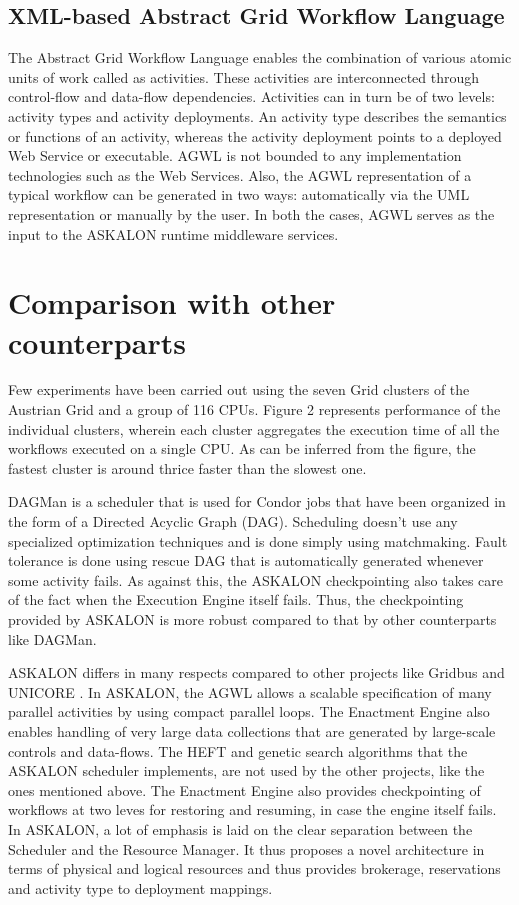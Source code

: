\documentclass[9pt,twocolumn,twoside]{../../styles/osajnl}
\begin{document}
\subsection{XML-based Abstract Grid Workflow Language}
The Abstract Grid Workflow Language enables the combination of various
atomic units of work called as activities.  These activities are
interconnected through control-flow and data-flow dependencies.
Activities can in turn be of two levels: activity types and activity
deployments.  An activity type describes the semantics or functions of
an activity, whereas the activity deployment points to a deployed Web
Service or executable.  AGWL is not bounded to any implementation
technologies such as the Web Services.  Also, the AGWL representation
of a typical workflow can be generated in two ways: automatically via
the UML representation or manually by the user.  In both the cases,
AGWL serves as the input to the ASKALON runtime middleware services.

\section{Comparison with other counterparts}
Few experiments have been carried out using the seven Grid clusters of
the Austrian Grid \cite{Austrian-grid} and a group of 116 CPUs.
Figure 2 represents performance of the individual clusters, wherein
each cluster aggregates the execution time of all the workflows
executed on a single CPU.  As can be inferred from the figure, the
fastest cluster is around thrice faster than the slowest one.

DAGMan \cite{DAGMan} is a scheduler that is used for Condor jobs that
have been organized in the form of a Directed Acyclic Graph (DAG).
Scheduling doesn't use any specialized optimization techniques and is
done simply using matchmaking.  Fault tolerance is done using rescue
DAG that is automatically generated whenever some activity fails.  As
against this, the ASKALON checkpointing also takes care of the fact
when the Execution Engine itself fails.  Thus, the checkpointing
provided by ASKALON is more robust compared to that by other
counterparts like DAGMan.

ASKALON differs in many respects compared to other projects like
Gridbus \cite{Gridbus} and UNICORE \cite{Unicore}.  In ASKALON, the
AGWL allows a scalable specification of many parallel activities by
using compact parallel loops.  The Enactment Engine also enables
handling of very large data collections that are generated by
large-scale controls and data-flows.  The HEFT and genetic search
algorithms that the ASKALON scheduler implements, are not used by the
other projects, like the ones mentioned above.  The Enactment Engine
also provides checkpointing of workflows at two leves for restoring
and resuming, in case the engine itself fails.  In ASKALON, a lot of
emphasis is laid on the clear separation between the Scheduler and the
Resource Manager.  It thus proposes a novel architecture in terms of
physical and logical resources and thus provides brokerage,
reservations and activity type to deployment mappings.
\end{document}
